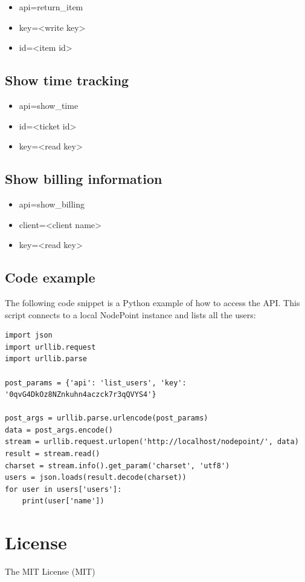 \documentclass[11pt]{article}
\begin{document}
\begin{itemize}
\item api=return\_item
\item key=<write key>
\item id=<item id>
\end{itemize}

\subsection{Show time tracking}

\begin{itemize}
\item api=show\_time
\item id=<ticket id>
\item key=<read key>
\end{itemize}

\subsection{Show billing information}

\begin{itemize}
\item api=show\_billing
\item client=<client name>
\item key=<read key>
\end{itemize}

\subsection{Code example}
The following code snippet is a Python example of how to access the API. This script connects to a local NodePoint instance and lists all the users:

\begin{lstlisting}
import json
import urllib.request
import urllib.parse

post_params = {'api': 'list_users', 'key': '0qvG4DkOz8NZnkuhn4aczck7r3qQVYS4'}

post_args = urllib.parse.urlencode(post_params)
data = post_args.encode()
stream = urllib.request.urlopen('http://localhost/nodepoint/', data)
result = stream.read()
charset = stream.info().get_param('charset', 'utf8')
users = json.loads(result.decode(charset))
for user in users['users']:
    print(user['name'])
\end{lstlisting}

\clearpage
\section{License}
The MIT License (MIT)
\end{document}

